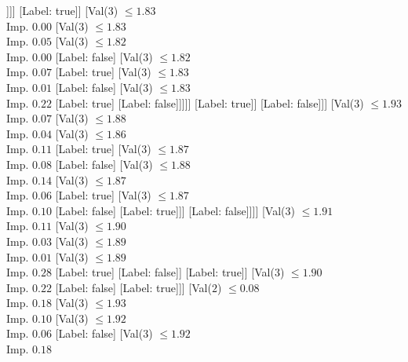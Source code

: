 \documentclass[margin=10pt]{standalone}
\begin{document}
\begin{forest}
											[Val($3$) $ \leq 1.81$ \\ Imp. $0.44$
												[Label: true]
												[Label: false]]]]
									[Label: true]]
								[Val($3$) $ \leq 1.83$ \\ Imp. $0.00$
									[Val($3$) $ \leq 1.83$ \\ Imp. $0.05$
										[Val($3$) $ \leq 1.82$ \\ Imp. $0.00$
											[Label: false]
											[Val($3$) $ \leq 1.82$ \\ Imp. $0.07$
												[Label: true]
												[Val($3$) $ \leq 1.83$ \\ Imp. $0.01$
													[Label: false]
													[Val($3$) $ \leq 1.83$ \\ Imp. $0.22$
														[Label: true]
														[Label: false]]]]]
										[Label: true]]
									[Label: false]]]
							[Val($3$) $ \leq 1.93$ \\ Imp. $0.07$
								[Val($3$) $ \leq 1.88$ \\ Imp. $0.04$
									[Val($3$) $ \leq 1.86$ \\ Imp. $0.11$
										[Label: true]
										[Val($3$) $ \leq 1.87$ \\ Imp. $0.08$
											[Label: false]
											[Val($3$) $ \leq 1.88$ \\ Imp. $0.14$
												[Val($3$) $ \leq 1.87$ \\ Imp. $0.06$
													[Label: true]
													[Val($3$) $ \leq 1.87$ \\ Imp. $0.10$
														[Label: false]
														[Label: true]]]
												[Label: false]]]]
									[Val($3$) $ \leq 1.91$ \\ Imp. $0.11$
										[Val($3$) $ \leq 1.90$ \\ Imp. $0.03$
											[Val($3$) $ \leq 1.89$ \\ Imp. $0.01$
												[Val($3$) $ \leq 1.89$ \\ Imp. $0.28$
													[Label: true]
													[Label: false]]
												[Label: true]]
											[Val($3$) $ \leq 1.90$ \\ Imp. $0.22$
												[Label: false]
												[Label: true]]]
										[Val($2$) $ \leq 0.08$ \\ Imp. $0.18$
											[Val($3$) $ \leq 1.93$ \\ Imp. $0.10$
												[Val($3$) $ \leq 1.92$ \\ Imp. $0.06$
													[Label: false]
													[Val($3$) $ \leq 1.92$ \\ Imp. $0.18$

\end{forest}
\end{document}
